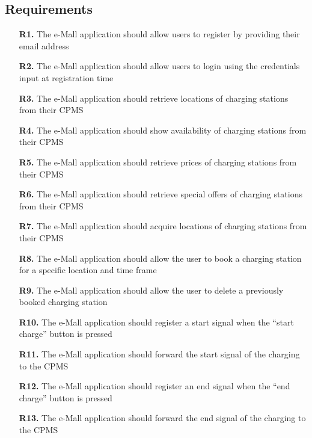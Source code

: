 \documentclass[12pt]{report}
\begin{document}
\subsection{Requirements}
\begin{itemize}
\item[\textbf{R1.}]The e-Mall application should allow users to register by providing their email address


\item[\textbf{R2.}]The e-Mall application should allow users to login using the credentials input at registration time

\item[\textbf{R3.}]The e-Mall application should retrieve locations of charging stations from their CPMS

\item[\textbf{R4.}]The e-Mall application should show availability of charging stations from their CPMS

\item[\textbf{R5.}]The e-Mall application should retrieve prices of charging stations from their CPMS

\item[\textbf{R6.}]The e-Mall application should retrieve special offers of charging stations from their CPMS

\item[\textbf{R7.}]The e-Mall application should acquire locations of charging stations from their CPMS

\item[\textbf{R8.}]The e-Mall application should allow the user to book a charging station for a specific location and time frame

\item[\textbf{R9.}]The e-Mall application should allow the user to delete a previously booked charging station

\item[\textbf{R10.}]The e-Mall application should register a start signal when the “start charge” button is pressed

\item[\textbf{R11.}]The e-Mall application should forward the start signal of the charging to the CPMS 

\item[\textbf{R12.}]The e-Mall application should register an end signal when the “end charge” button is pressed

\item[\textbf{R13.}]The e-Mall application should forward the end signal of the charging to the CPMS


\end{itemize}
\end{document}

